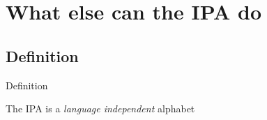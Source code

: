 \documentclass{beamer}
\subtitle[Non-English Sounds]{Articulation of non-English Sounds}
\newcommand{\suboneone}{Definition}
\begin{document}
  

  \section{What else can the IPA do}
    \subsection{\suboneone}
      \begin{frame}{\suboneone}
        \begin{alertblock}{}
          The IPA is a \emph{language independent} alphabet
        \end{alertblock}
      \end{frame}
\end{document}
